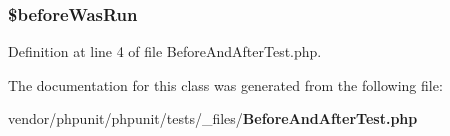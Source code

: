 \subsubsection[{\$before\+Was\+Run}]{\setlength{\rightskip}{0pt plus 5cm}\$before\+Was\+Run\hspace{0.3cm}{\ttfamily [static]}}\label{class_before_and_after_test_a0a0cbad406a07ae35f05837a8c5d0a24}


Definition at line 4 of file Before\+And\+After\+Test.\+php.



The documentation for this class was generated from the following file\+:\begin{DoxyCompactItemize}
\item 
vendor/phpunit/phpunit/tests/\+\_\+files/{\bf Before\+And\+After\+Test.\+php}\end{DoxyCompactItemize}
